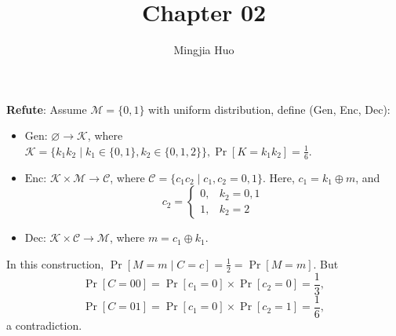 \documentclass[12pt]{article}
\newcommand{\K}{\mathcal{K}}
\newcommand{\M}{\mathcal{M}}
\newcommand{\C}{\mathcal{C}}
\newcommand{\Enc}{\text{Enc}}
\newcommand{\Dec}{\text{Dec}}
\newcommand{\Gen}{\text{Gen}}
\newenvironment{problem}[2][Problem]{\begin{trivlist}
\item[\hskip \labelsep {\bfseries #1}\hskip \labelsep {\bfseries #2.}]}{\end{trivlist}}
\begin{document}
 
 
\title{Chapter 02}
\author{Mingjia Huo}
\date{}
\maketitle

\begin{problem}{2.3} 
\textbf{Refute}: 
Assume $\mathcal{M}=\{0,1\}$ with uniform distribution, define (Gen, Enc, Dec):
\begin{itemize}
    \item $\Gen$: $\varnothing\rightarrow\K$, where $\mathcal{K}=\{k_1k_2\mid k_1\in\{0,1\}, k_2\in\{0,1,2\}\}, \Pr[K=k_1k_2]=\frac16$.
    \item $\Enc$: $\K\times\M\rightarrow\C$, where $\mathcal{C}=\{c_1c_2\mid c_1,c_2=0,1\}$. Here, $c_1=k_1\oplus m$, and
    \begin{equation*}
        c_2=\begin{cases}
        0, & k_2=0,1 \\
        1, & k_2=2
        \end{cases}
    \end{equation*}
    \item $\Dec$: $\K\times\C\rightarrow\M$, where $m=c_1\oplus k_1$.
\end{itemize}\par
In this construction, $\Pr[M=m\mid C=c]=\frac 12=\Pr[M=m]$. But $$\Pr[C=00]=\Pr[c_1=0]\times\Pr[c_2=0]=\frac13,$$ $$\Pr[C=01]=\Pr[c_1=0]\times\Pr[c_2=1]=\frac16,$$ a contradiction.
\end{problem}
\end{document}
